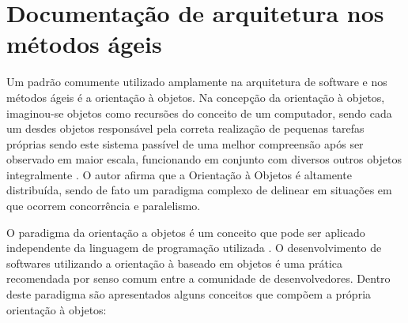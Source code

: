 
\section{Documentação de arquitetura nos métodos ágeis}

Um padrão comumente utilizado amplamente na arquitetura de software e nos métodos ágeis é a orientação à objetos. Na concepção da orientação à objetos, imaginou-se objetos como recursões do conceito de um computador, sendo cada um desdes objetos responsável pela correta realização de pequenas tarefas próprias sendo este sistema passível de uma melhor compreensão após ser observado em maior escala, funcionando em conjunto com diversos outros objetos integralmente \cite{reenskaug2009dci}. O autor afirma que a Orientação à Objetos é altamente distribuída, sendo de fato um paradigma complexo de delinear em situações em que ocorrem concorrência e paralelismo.

O paradigma da orientação a objetos é um conceito que pode ser aplicado independente da linguagem de programação utilizada \cite{rumbaugh1991object}. O desenvolvimento de softwares utilizando a orientação à baseado em objetos é uma prática recomendada por senso comum entre a comunidade de desenvolvedores. Dentro deste paradigma são apresentados alguns conceitos que compõem a própria orientação à objetos:

